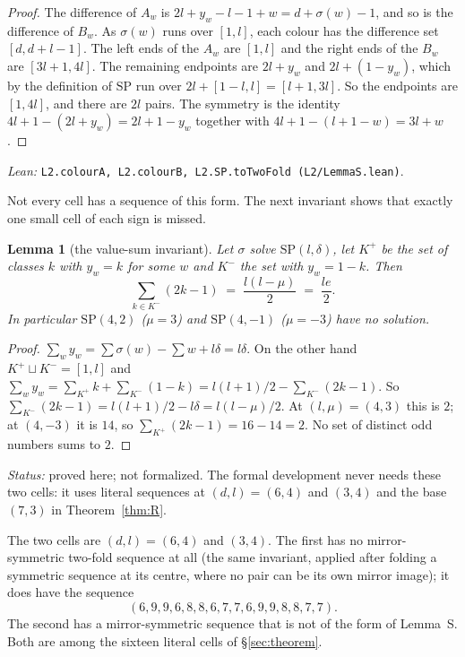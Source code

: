 \documentclass[11pt]{amsart}
\theoremstyle{plain}
\newtheorem{lemma}[theorem]{Lemma}
\theoremstyle{definition}
\theoremstyle{remark}
\newcommand{\SP}{\mathrm{SP}}
\newcommand{\lean}[1]{\par\smallskip
  {\small\raggedright\noindent\textit{Lean:} \texttt{#1}.\par}\smallskip}
\newcommand{\status}[1]{\par\smallskip
  {\small\raggedright\noindent\textit{Status:} #1\par}\smallskip}
\begin{document}
\begin{proof}
The difference of $A_w$ is $2l + y_w - l - 1 + w = d + \sigma(w) - 1$, and so is the
difference of $B_w$. As $\sigma(w)$ runs over $[1,l]$, each colour has the difference set
$[d,d+l-1]$. The left ends of the $A_w$ are $[1,l]$ and the right ends of the $B_w$ are
$[3l+1,4l]$. The remaining endpoints are $2l + y_w$ and $2l + (1-y_w)$, which by the
definition of $\SP$ run over $2l + [1-l,l] = [l+1,3l]$. So the endpoints are $[1,4l]$,
and there are $2l$ pairs. The symmetry is the identity
$4l+1-(2l+y_w) = 2l+1-y_w$ together with $4l+1-(l+1-w) = 3l+w$.
\end{proof}
\lean{L2.colourA, L2.colourB, L2.SP.toTwoFold (L2/LemmaS.lean)}

Not every cell has a sequence of this form. The next invariant shows that exactly one
small cell of each sign is missed.

\begin{lemma}[the value-sum invariant]\label{lem:I}
Let $\sigma$ solve $\SP(l,\delta)$, let $K^+$ be the set of classes $k$ with
$y_w = k$ for some $w$ and $K^-$ the set with $y_w = 1-k$. Then
\[
  \sum_{k \in K^-} (2k-1) \;=\; \frac{l(l-\mu)}{2} \;=\; \frac{le}{2}.
\]
In particular $\SP(4,2)$ ($\mu = 3$) and $\SP(4,-1)$ ($\mu = -3$) have no solution.
\end{lemma}

\begin{proof}
$\sum_w y_w = \sum \sigma(w) - \sum w + l\delta = l\delta$. On the other hand
$K^+ \sqcup K^- = [1,l]$ and $\sum_w y_w = \sum_{K^+} k + \sum_{K^-}(1-k) = l(l+1)/2
- \sum_{K^-}(2k-1)$. So $\sum_{K^-}(2k-1) = l(l+1)/2 - l\delta = l(l-\mu)/2$. At
$(l,\mu) = (4,3)$ this is $2$; at $(4,-3)$ it is $14$, so
$\sum_{K^+}(2k-1) = 16 - 14 = 2$. No set of distinct odd numbers sums to $2$.
\end{proof}
\status{proved here; not formalized. The formal development never needs these two
cells: it uses literal sequences at $(d,l) = (6,4)$ and $(3,4)$ and the base $(7,3)$ in
Theorem~\ref{thm:R}.}

The two cells are $(d,l) = (6,4)$ and $(3,4)$. The first has no mirror-symmetric two-fold
sequence at all (the same invariant, applied after folding a symmetric sequence at its
centre, where no pair can be its own mirror image); it does have the sequence
\[
  (6,9,9,6,8,8,6,7,7,6,9,9,8,8,7,7).
\]
The second has a mirror-symmetric sequence that is
not of the form of Lemma~S. Both are among the sixteen literal cells of
\S\ref{sec:theorem}.
\end{document}
